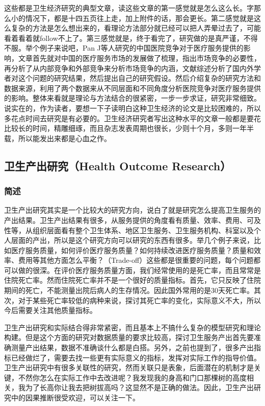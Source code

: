 \documentclass[11pt, a4paper]{article}
\begin{document}
这些都是卫生经济研究的典型文章，读这些文章的第一感觉就是怎么这么长。字那么小的情况下，都是十四五页往上走，加上附件的话，那会更长。第二感觉就是这么复杂的方法是怎么想出来的，看理论方法部分就已经可以把人弄晕过去了，可能看着看着就follow不上了。第三感觉就是，终于看完了，研究做的是真严谨，不得不服。举个例子来说吧，Pan J等人研究的中国医院竞争对于医疗服务提供的影响，文章首先就对中国的医疗服务市场的发展做了梳理，指出市场竞争的必要性，再分析了从内部竞争和外部竞争来分析市场竞争的内涵，文献综述分析了国内外学者对这个问题的研究结果，然后提出自己的研究假设。然后介绍复杂的研究方法和数据来源，利用了两个数据来从不同层面和不同角度分析医院竞争对医疗服务提供的影响。整体来看就是理论与方法结合的很紧密，一步一步求证，研究非常细致。说实在的，作为读者，要想一下子读明白这种卫生经济的论文是比较困难的，所以多花点时间去研究是有必要的。卫生经济研究者写出这种水平的文章一般都是要花比较长的时间，精雕细琢，而且杂志发表周期也很长，少则十个月，多则一年半载，所以能发出来都是心血之作。

\subsection{卫生产出研究（Health Outcome Research）}
\subsubsection{简述}
卫生产出研究其实是一个比较大的研究方向，说白了就是研究怎么提高卫生服务的产出结果。卫生产出结果有很多，从服务提供的角度看有质量、效率、费用、可及性等，从组织层面看有整个卫生体系、地区卫生服务、卫生服务机构、科室以及个人层面的产出，所以是这个研究方向可以研究的东西有很多。举几个例子来说，比如医疗服务质量，如何评价医疗服务质量？如何持续改进医疗服务质量？质量和效率、费用等其他方面怎么平衡？（Trade-off）这些都是很重要的问题，每个问题都可以做的很深。在评价医疗服务质量方面，我们经常使用的是死亡率，而且常常是住院死亡率。然而住院死亡率并不是一个很好的质量指标。首先，它只反映了住院期间的死亡，不能测量出院后病人的生存情况。因此国外常用的是30天死亡率。其次，对于某些死亡率较低的病种来说，探讨其死亡率的变化，实际意义不大，所以今后需要关注其他质量指标。

卫生产出研究和实际结合得非常紧密，而且基本上不搞什么复杂的模型研究和理论构建。但是这个方面的研究对数据质量的要求比较高，探讨卫生服务产出首先要准确测量产出结果，数据不准确谈什么都是白搭。另外，之前也提到了，很多产出指标已经做烂了，需要去找一些更有实际意义的指标，发挥对实际工作的指导价值。卫生产出研究中有很多关联性的研究，然而关联只是表象，后面潜在的机制才是关键，不然你怎么在实际工作中去改进呢？我发现我的身高和门口那棵树的高度相关，我为了长高你让我去把树拔高吗？这显然不是正确的做法。因此，卫生产出研究中的因果推断很受欢迎，可以关注一下。
\end{document}
